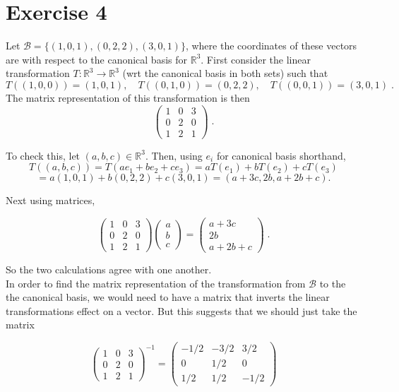 \documentclass[11pt]{article}
\begin{document}
\section*{Exercise 4}

Let $\mathcal{B} = \{(1,0,1), (0,2,2), (3,0,1)\}$, where the coordinates of these vectors are with respect to the canonical basis for $\mathbb{R}^3$. First consider the linear transformation $T : \mathbb{R}^3 \rightarrow \mathbb{R}^3$ (wrt the canonical basis in both sets) such that $$T((1,0,0)) = (1,0,1), \quad T((0,1,0)) = (0,2,2), \quad T((0,0,1)) = (3,0,1) \;.$$
The matrix representation of this transformation is then
$$ \begin{pmatrix}
1&0&3\\0&2&0\\1&2&1
\end{pmatrix} \;. $$

To check this, let $(a,b,c) \in \mathbb{R}^3$. Then, using $e_i$ for canonical basis shorthand, $$
T((a,b,c)) = T(ae_1 + be_2 + ce_3) = aT(e_1) + bT(e_2) + cT(e_3)$$ $$= a(1,0,1) + b(0,2,2) + c(3,0,1) = (a+3c,2b,a+2b+c).$$

Next using matrices,

$$\begin{pmatrix}
1&0&3\\0&2&0\\1&2&1
\end{pmatrix} \begin{pmatrix}
a\\b\\c
\end{pmatrix} = \begin{pmatrix}
a+3c\\2b\\a+2b+c
\end{pmatrix} \;. $$

So the two calculations agree with one another.\\

In order to find the matrix representation of the transformation from $\mathcal{B}$ to the the canonical basis, we would need to have a matrix that inverts the linear transformations effect on a vector. But this suggests that we should just take the matrix 

$$  
\begin{pmatrix}
1&0&3\\0&2&0\\1&2&1
\end{pmatrix}^{-1} = \begin{pmatrix}
-1/2&-3/2&3/2\\0&1/2&0\\1/2&1/2&-1/2
\end{pmatrix}$$
\end{document}
